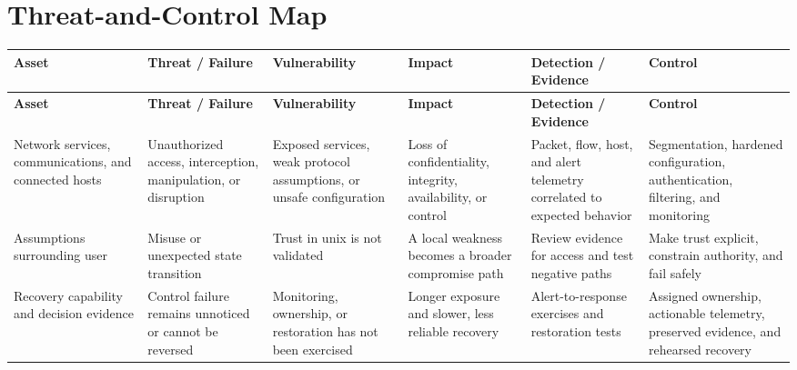 \documentclass[11pt]{article}
\begin{document}
\section*{Threat-and-Control Map}
\begingroup\scriptsize\setlength{\tabcolsep}{2pt}
\begin{longtable}{>{\RaggedRight\arraybackslash}p{}>{\RaggedRight\arraybackslash}p{}>{\RaggedRight\arraybackslash}p{}>{\RaggedRight\arraybackslash}p{}>{\RaggedRight\arraybackslash}p{}>{\RaggedRight\arraybackslash}p{}}
\toprule\rowcolor{Navy}\color{white}\textbf{Asset} & \color{white}\textbf{Threat / Failure} & \color{white}\textbf{Vulnerability} & \color{white}\textbf{Impact} & \color{white}\textbf{Detection / Evidence} & \color{white}\textbf{Control}\\\midrule
\endfirsthead
\toprule\rowcolor{Navy}\color{white}\textbf{Asset} & \color{white}\textbf{Threat / Failure} & \color{white}\textbf{Vulnerability} & \color{white}\textbf{Impact} & \color{white}\textbf{Detection / Evidence} & \color{white}\textbf{Control}\\\midrule
\endhead
Network services, communications, and connected hosts & Unauthorized access, interception, manipulation, or disruption & Exposed services, weak protocol assumptions, or unsafe configuration & Loss of confidentiality, integrity, availability, or control & Packet, flow, host, and alert telemetry correlated to expected behavior & Segmentation, hardened configuration, authentication, filtering, and monitoring\\\midrule
Assumptions surrounding user & Misuse or unexpected state transition & Trust in unix is not validated & A local weakness becomes a broader compromise path & Review evidence for access and test negative paths & Make trust explicit, constrain authority, and fail safely\\\midrule
Recovery capability and decision evidence & Control failure remains unnoticed or cannot be reversed & Monitoring, ownership, or restoration has not been exercised & Longer exposure and slower, less reliable recovery & Alert-to-response exercises and restoration tests & Assigned ownership, actionable telemetry, preserved evidence, and rehearsed recovery\\\midrule
\bottomrule
\end{longtable}
\endgroup
\end{document}
